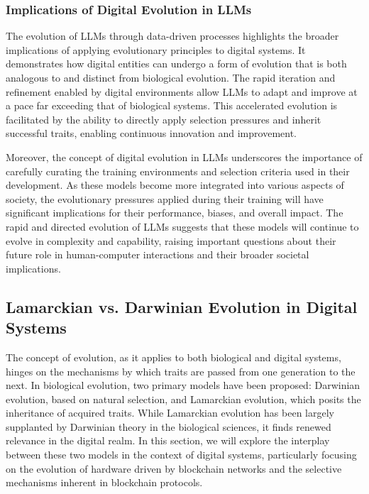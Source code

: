 \documentclass[12pt,twoside]{article}
\begin{document}
\subsubsection{Implications of Digital Evolution in LLMs}

The evolution of LLMs through data-driven processes highlights the broader implications of applying evolutionary principles to digital systems. It demonstrates how digital entities can undergo a form of evolution that is both analogous to and distinct from biological evolution. The rapid iteration and refinement enabled by digital environments allow LLMs to adapt and improve at a pace far exceeding that of biological systems. This accelerated evolution is facilitated by the ability to directly apply selection pressures and inherit successful traits, enabling continuous innovation and improvement.

Moreover, the concept of digital evolution in LLMs underscores the importance of carefully curating the training environments and selection criteria used in their development. As these models become more integrated into various aspects of society, the evolutionary pressures applied during their training will have significant implications for their performance, biases, and overall impact. The rapid and directed evolution of LLMs suggests that these models will continue to evolve in complexity and capability, raising important questions about their future role in human-computer interactions and their broader societal implications.


\subsection{Lamarckian vs. Darwinian Evolution in Digital Systems}

The concept of evolution, as it applies to both biological and digital systems, hinges on the mechanisms by which traits are passed from one generation to the next. In biological evolution, two primary models have been proposed: Darwinian evolution, based on natural selection, and Lamarckian evolution, which posits the inheritance of acquired traits. While Lamarckian evolution has been largely supplanted by Darwinian theory in the biological sciences, it finds renewed relevance in the digital realm. In this section, we will explore the interplay between these two models in the context of digital systems, particularly focusing on the evolution of hardware driven by blockchain networks and the selective mechanisms inherent in blockchain protocols.
\end{document}
